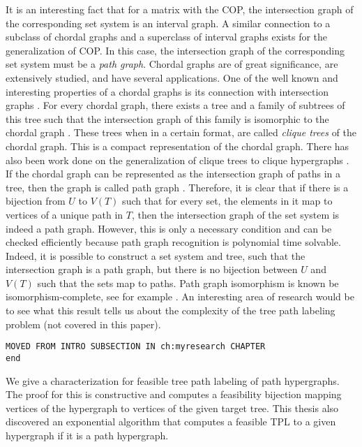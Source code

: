 It is an interesting fact that for a matrix with the COP, the
intersection graph of the corresponding set system is an interval
graph. %
A similar connection to a subclass of chordal graphs and a superclass
of interval graphs exists for the generalization of COP.  In this
case, the intersection graph of the corresponding set system must be a
{\em path graph}. Chordal graphs are of great significance, are
extensively studied, and have several applications.  One of the well
known and interesting properties of a chordal graphs is its connection
with intersection graphs \cite{mcg04}. For every chordal graph, there
exists a tree and a family of subtrees of this tree such that the
intersection graph of this family is isomorphic to the chordal graph
\cite{plr70,gav78,bp93}.  These trees when in a certain format, are
called {\em clique trees} \cite{apy92} of the chordal graph. This is a
compact representation of the chordal graph. There has also been work
done on the generalization of clique trees to clique hypergraphs
\cite{km02}.  If the chordal graph can be represented as the
intersection graph of paths in a tree, then the graph is called path
graph \cite{mcg04}.  Therefore, it is clear that if there is a
bijection from $U$ to $V(T)$ such that for every set, the elements in
it map to vertices of a unique path in $T$, then the intersection
graph of the set system is indeed a path graph.  However, this is only
a necessary condition and can be checked efficiently because path
graph recognition is polynomial time
solvable\cite{gav78,aas93}. Indeed, it is possible to construct a set
system and tree, such that the intersection graph is a path graph, but
there is no bijection between $U$ and $V(T)$ such that the sets map to
paths. Path graph isomorphism is known be isomorphism-complete, see
for example \cite{kklv10}. An interesting area of research would be to
see what this result tells us about the complexity of the tree path
labeling problem (not covered in this paper).

\begin{center} {\tt MOVED FROM INTRO SUBSECTION IN ch:myresearch
    CHAPTER\\ end}
\end{center}

We give a characterization for feasible tree path labeling of path
hypergraphs. The proof for this is constructive and computes a
feasibility bijection mapping vertices of the hypergraph to vertices
of the given target tree. This thesis also discovered an exponential
algorithm that computes a feasible TPL to a given hypergraph if it is
a path hypergraph.

